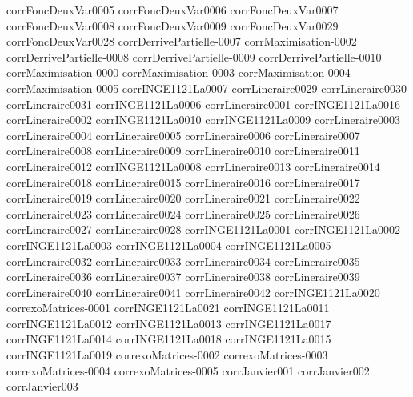 {corrFoncDeuxVar0005}
{corrFoncDeuxVar0006}
{corrFoncDeuxVar0007}
{corrFoncDeuxVar0008}
{corrFoncDeuxVar0009}
{corrFoncDeuxVar0029}
{corrFoncDeuxVar0028}
{corrDerrivePartielle-0007}
{corrMaximisation-0002}
{corrDerrivePartielle-0008}
{corrDerrivePartielle-0009}
{corrDerrivePartielle-0010}
{corrMaximisation-0000}
{corrMaximisation-0003}
{corrMaximisation-0004}
{corrMaximisation-0005}
{corrINGE1121La0007}
{corrLineraire0029}
{corrLineraire0030}
{corrLineraire0031}
{corrINGE1121La0006}
{corrLineraire0001}
{corrINGE1121La0016}
{corrLineraire0002}
{corrINGE1121La0010}
{corrINGE1121La0009}
{corrLineraire0003}
{corrLineraire0004}
{corrLineraire0005}
{corrLineraire0006}
{corrLineraire0007}
{corrLineraire0008}
{corrLineraire0009}
{corrLineraire0010}
{corrLineraire0011}
{corrLineraire0012}
{corrINGE1121La0008}
{corrLineraire0013}
{corrLineraire0014}
{corrLineraire0018}
{corrLineraire0015}
{corrLineraire0016}
{corrLineraire0017}
{corrLineraire0019}
{corrLineraire0020}
{corrLineraire0021}
{corrLineraire0022}
{corrLineraire0023}
{corrLineraire0024}
{corrLineraire0025}
{corrLineraire0026}
{corrLineraire0027}
{corrLineraire0028}
{corrINGE1121La0001}
{corrINGE1121La0002}
{corrINGE1121La0003}
{corrINGE1121La0004}
{corrINGE1121La0005}
{corrLineraire0032}
{corrLineraire0033}
{corrLineraire0034}
{corrLineraire0035}
{corrLineraire0036}
{corrLineraire0037}
{corrLineraire0038}
{corrLineraire0039}
{corrLineraire0040}
{corrLineraire0041}
{corrLineraire0042}
{corrINGE1121La0020}
{correxoMatrices-0001}
{corrINGE1121La0021}
{corrINGE1121La0011}
{corrINGE1121La0012}
{corrINGE1121La0013}
{corrINGE1121La0017}
{corrINGE1121La0014}
{corrINGE1121La0018}
{corrINGE1121La0015}
{corrINGE1121La0019}
{correxoMatrices-0002}
{correxoMatrices-0003}
{correxoMatrices-0004}
{correxoMatrices-0005}
{corrJanvier001}
{corrJanvier002}
{corrJanvier003}
